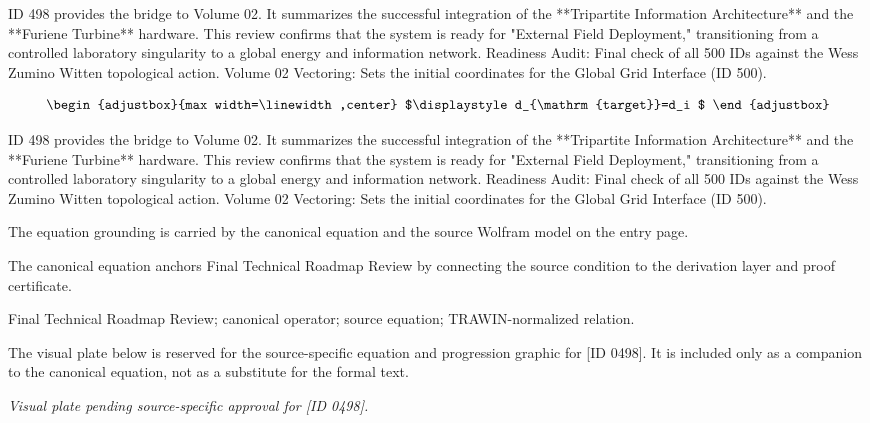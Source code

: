 ID 498 provides the bridge to Volume 02. It summarizes the successful integration of the **Tripartite Information Architecture** and the **Furiene Turbine** hardware. This review confirms that the system is ready for "External Field Deployment," transitioning from a controlled laboratory singularity to a global energy and information network. Readiness Audit: Final check of all 500 IDs against the Wess Zumino Witten topological action. Volume 02 Vectoring: Sets the initial coordinates for the Global Grid Interface (ID 500).

\[
\begin{adjustbox}{max width=\linewidth,center}
$\displaystyle
d_{\mathrm{target}}=d_i
$
\end{adjustbox}
\]

ID 498 provides the bridge to Volume 02. It summarizes the successful integration of the **Tripartite Information Architecture** and the **Furiene Turbine** hardware. This review confirms that the system is ready for "External Field Deployment," transitioning from a controlled laboratory singularity to a global energy and information network. Readiness Audit: Final check of all 500 IDs against the Wess Zumino Witten topological action. Volume 02 Vectoring: Sets the initial coordinates for the Global Grid Interface (ID 500).

The equation grounding is carried by the canonical equation and the source Wolfram model on the entry page.

The canonical equation anchors Final Technical Roadmap Review by connecting the source condition to the derivation layer and proof certificate.

Final Technical Roadmap Review; canonical operator; source equation; TRAWIN-normalized relation.
\endgroup

\begingroup\footnotesize\sloppy
The visual plate below is reserved for the source-specific equation and progression graphic for [ID 0498]. It is included only as a companion to the canonical equation, not as a substitute for the formal text.
\par\endgroup
\begingroup\footnotesize\itshape
Visual plate pending source-specific approval for [ID 0498].
\par\endgroup

